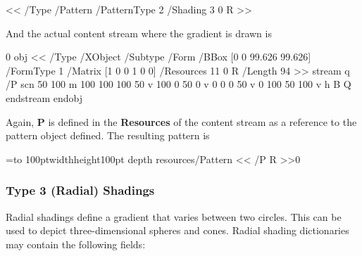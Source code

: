 \blisting
<<
    /Type /Pattern  %
    /PatternType 2  %
    /Shading 3 0 R  %
>> 
\elisting

\noindent And the actual content stream where the gradient is drawn is

 0 obj
<<
/Type /XObject
/Subtype /Form
/BBox [0 0 99.626 99.626]
/FormType 1
/Matrix [1 0 0 1 0 0]
/Resources 11 0 R
/Length 94        
>>
stream
q
/P scn
50 100 m
100 100 100 50 v 100 0 50 0 v 0 0 0 50 v 0 100 50 100 v %
h
B                                                       %
Q 
endstream
endobj
\elisting

\noindent Again, {\bf P} is defined in the {\bf Resources} of the content stream as a reference to the pattern
object defined.
The resulting pattern is

\immediate{}

\immediate{}

\immediate{}

\bgroup
{}=\hbox to 100pt{\vrule width\z@ height100pt depth\z@%
}
\pdfxform resources{/Pattern << /P \the\pdflastobj{} R >>}0

\centerline{\pdfrefxform\pdflastxform}
\egroup

\subsubsection{Type 3 (Radial) Shadings}

Radial shadings define a gradient that varies between two circles.
This can be used to depict three-dimensional spheres and cones.
Radial shading dictionaries may contain the following fields:

